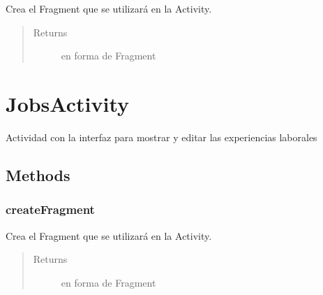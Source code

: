 \documentclass[letterpaper,10pt,english]{sphinxmanual}
\begin{document}
\begin{fulllineitems}
\label{Activities/AddSkillActivity:com.fiuba.tallerii.jobify.AddSkillActivity.createFragment()}
Crea el Fragment que se utilizará en la Activity.
\begin{quote}\begin{description}
\item[{Returns}] \leavevmode
{} en forma de Fragment

\end{description}\end{quote}

\end{fulllineitems}



\section{JobsActivity}
\label{Activities/JobsActivity:jobsactivity}\label{Activities/JobsActivity::doc}

\begin{fulllineitems}
\label{Activities/JobsActivity:com.fiuba.tallerii.jobify.JobsActivity}
Actividad con la interfaz para mostrar y editar las experiencias laborales

\end{fulllineitems}



\subsection{Methods}
\label{Activities/JobsActivity:methods}

\subsubsection{createFragment}
\label{Activities/JobsActivity:createfragment}

\begin{fulllineitems}
\label{Activities/JobsActivity:com.fiuba.tallerii.jobify.JobsActivity.createFragment()}
Crea el Fragment que se utilizará en la Activity.
\begin{quote}\begin{description}
\item[{Returns}] \leavevmode
{} en forma de Fragment

\end{description}\end{quote}

\end{fulllineitems}
\end{document}
